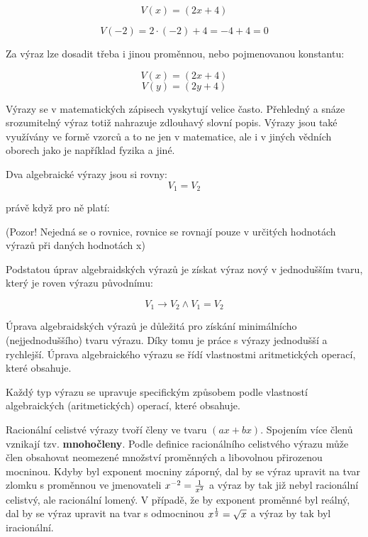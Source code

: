 $$ V(x) = (2x + 4)$$

$$ V(-2) = 2 \cdot (-2) +4 = -4 +4 = 0 $$

Za výraz lze dosadit třeba i jinou proměnnou, nebo pojmenovanou konstantu:

$$ V(x) = (2x + 4)$$
$$ V(y) = (2y + 4)$$

Výrazy se v matematických zápisech vyskytují velice často. Přehledný a snáze srozumitelný výraz totiž nahrazuje zdlouhavý slovní popis. Výrazy jsou také využívány ve formě vzorců a to ne jen v matematice, ale i v jiných vědních oborech jako je například fyzika a jiné.


Dva algebraické výrazy jsou si rovny:
$$ V_1 = V_2 $$

právě když pro ně platí:

\vskip 4mm
\vskip 4mm

(Pozor! Nejedná se o rovnice, rovnice se rovnají pouze v určitých hodnotách výrazů při daných hodnotách x)



Podstatou úprav algebraidských výrazů je získat výraz nový v jednodušším tvaru, který je roven výrazu původnímu:

$$ V_1 \rightarrow V_2 \wedge V_1 = V_2 $$

Úprava algebraidských výrazů je důležitá pro získání minimálnícho (nejjednoduššího) tvaru výrazu. Díky tomu je práce s výrazy jednodušší a rychlejší. Úprava algebraického výrazu se řídí vlastnostmi aritmetických operací, které obsahuje.

Každý typ výrazu se upravuje specifickým způsobem podle vlastností algebraických (aritmetických) operací, které obsahuje.




Racionální celistvé výrazy tvoří členy ve tvaru $(ax + bx)$. Spojením více členů vznikají tzv. {\bf mnohočleny}. Podle definice racionálního celistvého výrazu může člen obsahovat neomezené množství proměnných a libovolnou přirozenou mocninou. Kdyby byl exponent mocniny záporný, dal by se výraz upravit na tvar zlomku s proměnnou ve jmenovateli $x^{-2} = {1\over x^{2}}$ a výraz by tak již nebyl racionální celistvý, ale racionální lomený. V případě, že by exponent proměnné byl reálný, dal by se výraz upravit na tvar s odmocninou $x^{1\over 2} = \sqrt{x}$ a výraz by tak byl iracionální.

